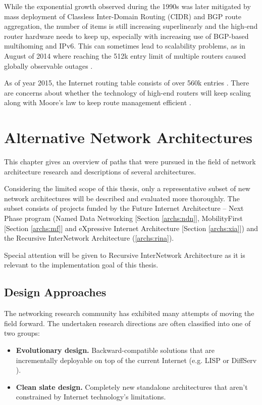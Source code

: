         While the exponential growth observed during the 1990s was later mitigated by mass deployment of Classless Inter-Domain Routing (CIDR) and BGP route aggregation, the number of items is still increasing superlinearly and the high-end router hardware needs to keep up, especially with increasing use of BGP-based multihoming and IPv6. This can sometimes lead to scalability problems, as in August of 2014 where reaching the 512k entry limit of multiple routers caused globally observable outages \cite{512k_day}.

        As of year 2015, the Internet routing table consists of over 560k entries \cite{bgpgrow}. There are concerns about whether the technology of high-end routers will keep scaling along with Moore's law to keep route management efficient \cite{rfc4984}.


\chapter{Alternative Network Architectures}\label{archs}

    This chapter gives an overview of paths that were pursued in the field of network architecture research and descriptions of several architectures.

    Considering the limited scope of this thesis, only a representative subset of new network architectures will be described and evaluated more thoroughly. The subset consists of projects funded by the Future Internet Architecture -- Next Phase program \cite{fia} (Named Data Networking [Section \ref{archs:ndn}], MobilityFirst [Section \ref{archs:mf}] and eXpressive Internet Architecture [Section \ref{archs:xia}]) and the Recursive InterNetwork Architecture (\ref{archs:rina}).

    Special attention will be given to Recursive InterNetwork Architecture as it is relevant to the implementation goal of this thesis.

    \section{Design Approaches}

        The networking research community has exhibited many attempts of moving the field forward. The undertaken research directions are often classified into one of two groups:

        \begin{itemize}
            \item \textbf{Evolutionary design.} Backward-compatible solutions that are incrementally deployable on top of the current Internet (e.g. LISP \cite{rfc6830} or DiffServ \cite{rfc2474}).
            \item \textbf{Clean slate design.} Completely new standalone architectures that aren't constrained by Internet technology's limitations.
        \end{itemize}

